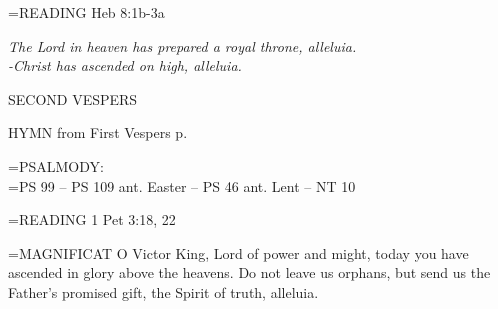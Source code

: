 \hangindent=\parindent \small{READING}    Heb 8:1b-3a \textbf{   }

\begin{center}
\textit{The Lord in heaven has prepared a royal throne, alleluia.\\
-Christ has ascended on high, alleluia.}
\end{center}

\begin{flushleft}\normalsize SECOND VESPERS\\\end{flushleft}

HYMN from First Vespers p. \pageref{ascension:hymn}

\hangindent=\parindent \small{PSALMODY:}\\
\hangindent=\parindent  PS 99 -- PS 109 ant. Easter -- PS 46 ant. Lent -- NT 10\vspace{0.5em}

\hangindent=\parindent \small{READING}    1 Pet 3:18, 22 \textbf{   \\}

\hangindent=\parindent \small{MAGNIFICAT 	O Victor King, Lord of power and might, today you have ascended in glory above the heavens. Do not leave us orphans, but send us the Father's promised gift, the Spirit of truth, alleluia.\\}
